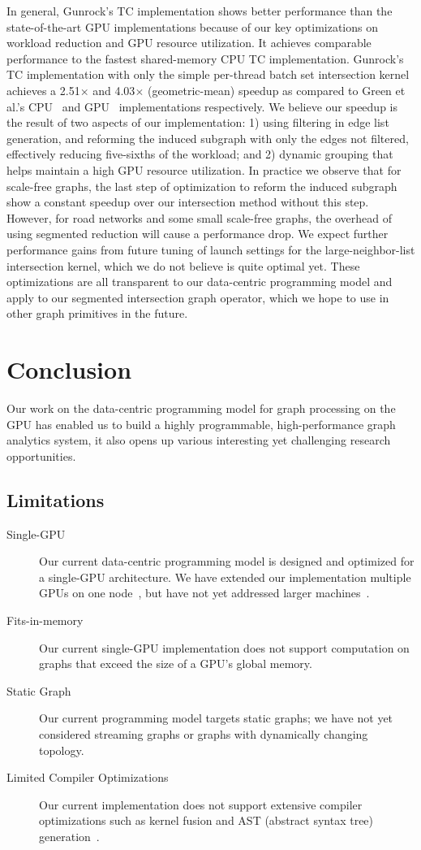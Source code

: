 \documentclass[format=acmsmall,review=false,screen=true]{acmart}
\begin{document}
In general, Gunrock's TC implementation shows better performance than
the state-of-the-art GPU implementations because of our key
optimizations on workload reduction and GPU resource utilization. It
achieves comparable performance to the fastest shared-memory CPU TC
implementation. Gunrock's TC implementation with only the simple
per-thread batch set intersection kernel achieves a 2.51$\times$ and
4.03$\times$ (geometric-mean) speedup as compared to Green et al.'s
CPU~ and GPU~
implementations respectively. We believe our speedup is the result of
two aspects of our implementation: 1) using filtering in edge list
generation, and reforming the induced subgraph with only the edges not
filtered, effectively reducing five-sixths of the workload; and 2)
dynamic grouping that helps maintain a high GPU resource utilization.
In practice we observe that for scale-free graphs, the last step of
optimization to reform the induced subgraph show a constant speedup
over our intersection method without this step. However, for road
networks and some small scale-free graphs, the overhead of using
segmented reduction will cause a performance drop. We expect further
performance gains from future tuning of launch settings for the
large-neighbor-list intersection kernel, which we do not believe is
quite optimal yet. These optimizations are all transparent to our
data-centric programming model and apply to our segmented intersection
graph operator, which we hope to use in other graph primitives in the
future.

\section{Conclusion}
\label{sec:conc}
Our work on the data-centric programming model for graph processing on
the GPU has enabled us to build a highly programmable,
high-performance graph analytics system, it also opens up various
interesting yet challenging research opportunities.

\subsection{Limitations}
\begin{description}
\item[Single-GPU] Our current data-centric programming model is
  designed and optimized for a single-GPU architecture. We have
  extended our implementation multiple GPUs on one
  node~\cite{Pan:2016:MGA}, but have not yet addressed larger
  machines~\cite{Pearce:2014:FPT}.
\item[Fits-in-memory] Our current single-GPU implementation does not
  support computation on graphs that exceed the size of a GPU's global
  memory.
\item[Static Graph] Our current programming model targets static
  graphs; we have not yet considered streaming graphs or graphs with
  dynamically changing topology.
\item[Limited Compiler Optimizations] Our current implementation does
  not support extensive compiler optimizations such as kernel fusion
  and AST (abstract syntax tree) generation~\cite{Pai:2016:ACT}.
\end{description}
\end{document}
